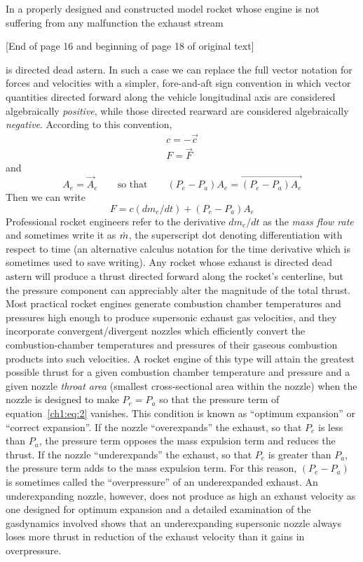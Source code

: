 In a properly designed and constructed model rocket whose engine is not suffering from any malfunction the
exhaust stream
\begin{center}
[End of page 16 and beginning of page 18 of original text]
\end{center}
is directed dead astern. In such a case we can replace the full vector notation for forces and velocities
with a simpler, fore-and-aft sign convention in which vector quantities directed forward along the vehicle
longitudinal axis are considered algebraically \emph{positive}, while those directed rearward are considered
algebraically \emph{negative}. According to this convention,
\begin{gather*}
c = -\vec{c}\\
F = \vec{F}
\end{gather*}
and
\begin{equation*}
A_e = \vec{A}_e \qquad\text{so that}\qquad (P_e - P_a)A_e = \overrightarrow{(P_e - P_a)A_e}
\end{equation*}
Then we can write
\begin{equation*}\tag{2}
F = c(dm_e/dt) + (P_e - P_a)A_e
\end{equation*}
Professional rocket engineers refer to the derivative $dm_e/dt$ as the \emph{mass flow rate} and sometimes
write it as $\dot{m}$, the superscript dot denoting differentiation with respect to time (an alternative
calculus notation for the time derivative which is sometimes used to save writing). Any rocket whose exhaust
is directed dead astern will produce a thrust directed forward along the rocket's centerline, but the
pressure component can appreciably alter the magnitude of the total thrust. Most practical rocket engines
generate combustion chamber temperatures and pressures high enough to produce supersonic exhaust gas
velocities, and they incorporate convergent/divergent nozzles which efficiently convert the
combustion-chamber temperatures and pressures of their gaseous combustion products into such velocities. A
rocket engine of this type will attain the greatest possible thrust for a given combustion chamber
temperature and pressure and a given nozzle \emph{throat area} (smallest cross-sectional area within the
nozzle) when the nozzle is designed to make $P_e = P_a$ so that the pressure term of
equation~\eqref{ch1:eq:2} vanishes. This condition is known as ``optimum expansion'' or ``correct
expansion''. If the nozzle ``overexpands'' the exhaust, so that $P_e$ is less than $P_a$, the pressure term
opposes the mass expulsion term and reduces the thrust. If the nozzle ``underexpands'' the exhaust, so that
$P_e$ is greater than $P_a$, the pressure term adds to the mass expulsion term. For this reason,
$(P_e - P_a)$ is sometimes called the ``overpressure'' of an underexpanded exhaust. An underexpanding
nozzle, however, does not produce as high an exhaust velocity as one designed for optimum expansion and a
detailed examination of the gasdynamics involved shows that an underexpanding supersonic nozzle always loses
more thrust in reduction of the exhaust velocity than it gains in overpressure.


